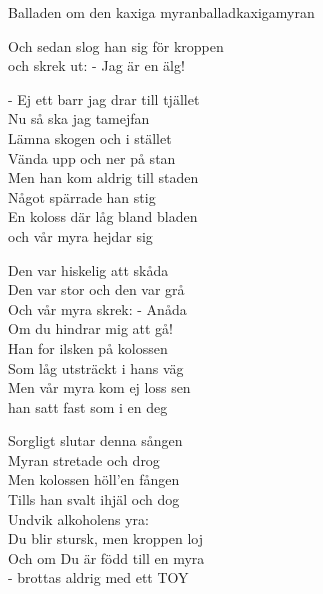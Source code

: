 \begin{song}{Balladen om den kaxiga myran}{balladkaxigamyran}
\begin{vers}
Och sedan slog han sig för kroppen\\
\repopen och skrek ut: - Jag är en älg! \repclose\\
\end{vers}
\begin{vers}
- Ej ett barr jag drar till tjället\\
Nu så ska jag tamejfan\\
Lämna skogen och i stället\\
Vända upp och ner på stan\\
Men han kom aldrig till staden\\
Något spärrade han stig\\
En koloss där låg bland bladen\\
\repopen och vår myra hejdar sig \repclose\\
\end{vers}
\begin{vers}
Den var hiskelig att skåda\\
Den var stor och den var grå\\
Och vår myra skrek: - Anåda\\
Om du hindrar mig att gå!\\
Han for ilsken på kolossen\\
Som låg utsträckt i hans väg\\
Men vår myra kom ej loss sen\\
\repopen han satt fast som i en deg \repclose\\
\end{vers}

\newp

\begin{vers}
Sorgligt slutar denna sången\\
Myran stretade och drog\\
Men kolossen höll'en fången\\
Tills han svalt ihjäl och dog\\
Undvik alkoholens yra:\\
Du blir stursk, men kroppen loj\\
Och om Du är född till en myra\\
\repopen - brottas aldrig med ett TOY \repclose\\
\end{vers}
\end{song}
